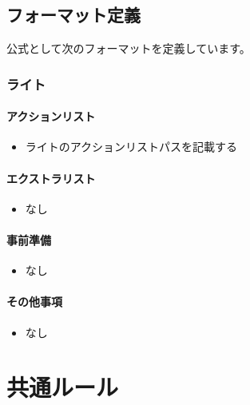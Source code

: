 \documentclass[letterpaper,10pt,dvipdfmx]{sphinxmanual}
\begin{document}
\section{フォーマット定義}
\label{\detokenize{format/format:id7}}
公式として次のフォーマットを定義しています。


\subsection{ライト}
\label{\detokenize{format/light:id1}}\label{\detokenize{format/light::doc}}

\subsubsection{アクションリスト}
\label{\detokenize{format/light:id2}}\begin{itemize}
\item {} 
ライトのアクションリストパスを記載する

\end{itemize}


\subsubsection{エクストラリスト}
\label{\detokenize{format/light:id3}}\begin{itemize}
\item {} 
なし

\end{itemize}


\subsubsection{事前準備}
\label{\detokenize{format/light:id4}}\begin{itemize}
\item {} 
なし

\end{itemize}


\subsubsection{その他事項}
\label{\detokenize{format/light:id5}}\begin{itemize}
\item {} 
なし

\end{itemize}


\chapter{共通ルール}
\label{\detokenize{common/common:id1}}\label{\detokenize{common/common::doc}}
\end{document}
